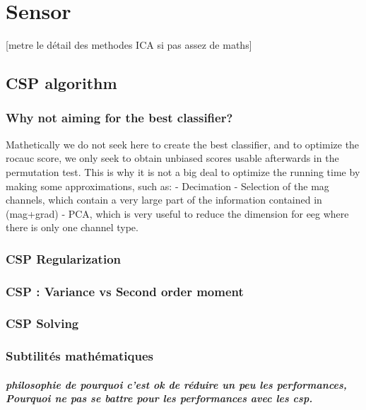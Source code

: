 
\chapter{Sensor}

[metre le détail des methodes ICA si pas assez de maths]
\section{CSP algorithm}

\subsection{Why not aiming for the best classifier?}
Mathetically we do not seek here to create the best classifier,
and to optimize the rocauc score, we only seek
to obtain unbiased scores usable afterwards in the permutation test.
This is why it is not a big deal to optimize the running time
by making some approximations, such as:
- Decimation
- Selection of the mag channels, which contain a very large part of
the information contained in (mag+grad)
- PCA, which is very useful to reduce the dimension for eeg
where there is only one channel type.

\subsection{CSP Regularization}

\subsection{CSP : Variance vs Second order moment}

\subsection{CSP Solving}


\subsection{Subtilités mathématiques}

\paragraph{philosophie de pourquoi c'est ok de réduire un peu les performances, Pourquoi ne pas se battre pour les performances avec les csp.}

